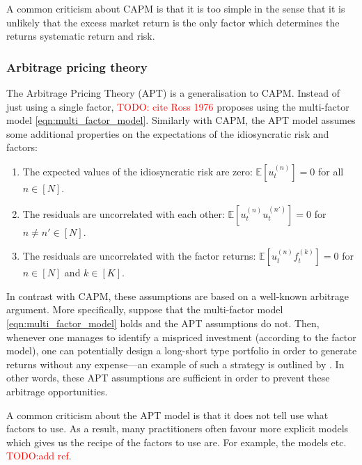 \documentclass[12pt]{article}
\begin{document}
A common criticism about CAPM is that it is too simple in the sense that it is unlikely that the excess market return is the only factor which determines the returns systematic return and risk.
\subsubsection{Arbitrage pricing theory}
The Arbitrage Pricing Theory (APT) is a generalisation to CAPM. Instead of just using a single factor, \textcolor{red}{TODO: cite Ross 1976} proposes using the multi-factor model \eqref{eqn:multi_factor_model}. Similarly with CAPM, the APT model assumes some additional properties on the expectations of the idiosyncratic risk and factors: 
\begin{enumerate}
	\item The expected values of the idiosyncratic risk are zero: $\mathbb{E}[u_t^{(n)}] = 0$ for all $n \in [N]$.
	\item  The residuals are uncorrelated with each other: $\mathbb{E}[u^{(n)}_t u^{(n')}_t] = 0$ for $n \neq n' \in [N]$.
	\item  The residuals are uncorrelated with the factor returns: $\mathbb{E}[u^{(n)}_t f^{(k)}_t] = 0$ for $n \in [N]$ and $k \in [K]$.
\end{enumerate}
In contrast with CAPM, these assumptions are based on a well-known arbitrage argument. More specifically, suppose that the multi-factor model \eqref{eqn:multi_factor_model} holds and the APT assumptions do not. Then, whenever one manages to identify a mispriced investment (according to the factor model), one can potentially design a long-short type portfolio in order to generate returns without any expense---an example of such a strategy is outlined by \citet[Chapter 7]{grinold1999}. In other words, these APT assumptions are sufficient in order to prevent these arbitrage opportunities.

A common criticism about the APT model is that it does not tell use what factors to use. As a result, many practitioners often favour more explicit models which gives us the recipe of the factors to use are. For example, the\cite{fama1993jofe} models etc. \textcolor{red}{TODO:add ref}.
\end{document}
